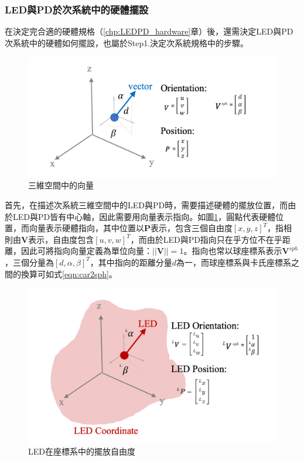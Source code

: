             
            
        

            

    \subsubsection{LED與PD於次系統中的硬體擺設}
        \label{chp:config}


        

        在決定完合適的硬體規格（\ref{chp:LEDPD_hardware}章）後，還需決定LED與PD次系統中的硬體如何擺設，也屬於Step1.決定次系統規格中的步驟。

        \begin{figure}[htpb]
            \centering
            \includegraphics[width=13cm]{ch2pic/vec_config.png}
            \caption{三維空間中的向量}
            \label{pic:vec_config}
        \end{figure}
        
        首先，在描述次系統三維空間中的LED與PD時，需要描述硬體的擺放位置，而由於LED與PD皆有中心軸，因此需要用向量表示指向。如圖\ref{pic:vec_config}，圓點代表硬體位置，而向量表示硬體指向，其中位置以$\boldsymbol{P}$表示，包含三個自由度$[x,y,z]^T$，指相則由$\boldsymbol{V}$表示，自由度包含$[u,v,w]^T$，而由於LED與PD指向只在乎方位不在乎距離，因此可將指向向量定義為單位向量：$||\boldsymbol{V}||=1$。指向也常以球座標系表示$\boldsymbol{V}^{sph}$，三個分量為$[d,\alpha,\beta]^T$，其中指向的距離分量$d$為一，而球座標系與卡氏座標系之間的換算可如式\ref{eqn:car2sph}。
        

        \begin{figure}[htpb]
            \centering
            \includegraphics[width=12cm]{ch2pic/LED_config.png}
            \caption{LED在座標系中的擺放自由度}
            \label{pic:led_config}
        \end{figure}

